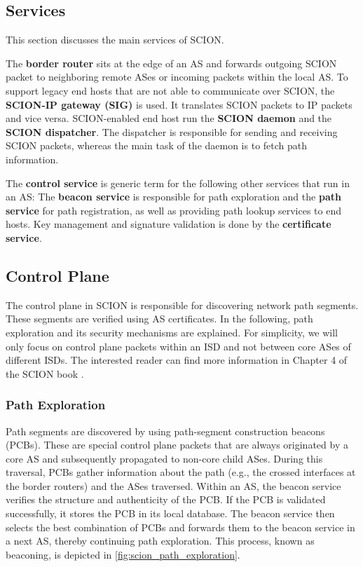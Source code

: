 \subsection{Services}
This section discusses the main services of SCION.

The \textbf{border router} sits at the edge of an AS and forwards outgoing SCION packet to neighboring remote ASes or incoming packets within the local AS.
To support legacy end hosts that are not able to communicate over SCION, the \textbf{SCION-IP gateway (SIG)} is used.
It translates SCION packets to IP packets and vice versa.
SCION-enabled end host run the \textbf{SCION daemon} and the \textbf{SCION dispatcher}.
The dispatcher is responsible for sending and receiving SCION packets, whereas the main task of the daemon is to fetch path information.

The \textbf{control service} is generic term for the following other services that run in an AS:
The \textbf{beacon service} is responsible for path exploration and the \textbf{path service} for path registration, as well as providing path lookup services to end hosts.
Key management and signature validation is done by the \textbf{certificate service}.


\subsection{Control Plane}
\label{sec:control_plane}

The control plane in SCION is responsible for discovering network path segments.
These segments are verified using AS certificates.
In the following, path exploration and its security mechanisms are explained.
For simplicity, we will only focus on control plane packets within an ISD and not between core ASes of different ISDs.
The interested reader can find more information in Chapter 4 of the SCION book \cite{Perrig2022}.

\subsubsection{Path Exploration}
Path segments are discovered by using path-segment construction beacons (PCBs).
These are special control plane packets that are always originated by a core AS and subsequently propagated to non-core child ASes.
During this traversal, PCBs gather information about the path (e.g., the crossed interfaces at the border routers) and the ASes traversed.
Within an AS, the beacon service verifies the structure and authenticity of the PCB.
If the PCB is validated successfully, it stores the PCB in its local database.
The beacon service then selects the best combination of PCBs and forwards them to the beacon service in a next AS, thereby continuing path exploration.
This process, known as beaconing, is depicted in \cref{fig:scion_path_exploration}.


